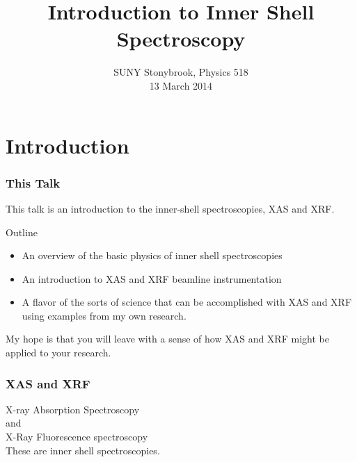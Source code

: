 \documentclass[10pt, xcolor=x11names, compress]{beamer}
\title{Introduction to Inner Shell Spectroscopy}
\date{SUNY Stonybrook, Physics 518\\13 March 2014}
\begin{document}
\maketitle


\section[Introduction]{Introduction}

\begin{frame}
  \frametitle{This Talk}
  
  This talk is an introduction to the inner-shell spectroscopies, XAS
  and XRF.

  \bigskip

  \begin{block}{Outline}
    \begin{itemize}
    \item An overview of the basic physics of inner shell spectroscopies
    \item An introduction to XAS and XRF beamline instrumentation
    \item A flavor of the sorts of science that can be accomplished
      with XAS and XRF using examples from my own research.
    \end{itemize}
  \end{block}

  \bigskip

  My hope is that you will leave with a sense of how XAS and XRF might
  be applied to \alert{your} research.
\end{frame}

\begin{frame}
  \frametitle{XAS and XRF}

  \begin{center}
    \Large
    \alert{X}-ray \alert{A}bsorption \alert{S}pectroscopy\\
    and\\
    \alert{X}-\alert{R}ay \alert{F}luorescence spectroscopy\\[3ex]
    These are {\color{Firebrick4}inner shell}
    {\color{Purple4}spectroscopies}.
  \end{center}

  \begin{columns}[T]
    \begin{column}{0.5\linewidth}
    \end{column}
    \begin{column}{0.5\linewidth}
    \end{column}
  \end{columns}
\end{frame}
\end{document}
